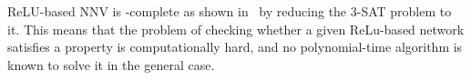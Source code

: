 \documentclass[oneside,11pt,dvipsnames]{book}
\numberwithin{equation}{section}
\theoremstyle{definition}
\theoremstyle{remark}
\newcommand{\tvn}[1]{\iftoggle{usecomment}{{\color{red}{[TVN]: #1}}}{}}
\begin{document}
ReLU-based NNV is \NP{}-complete as shown in~\cite{katz2017reluplex,salzer2023reachability} by reducing the 3-SAT problem to it. This means that the problem of checking whether a given ReLu-based network satisfies a property is computationally hard, and no polynomial-time algorithm is known to solve it in the general case.











\end{document}
